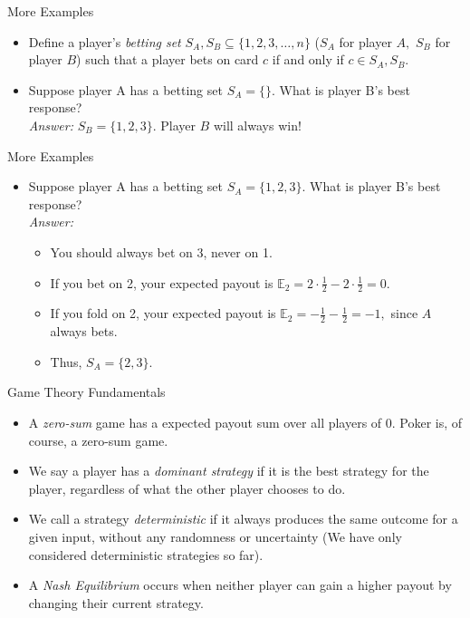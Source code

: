 \documentclass[aspectratio=169]{beamer}
\begin{document}
\begin{frame}{More Examples}
\begin{itemize}
 \item Define a player's \textit{betting set} $S_A, S_B \subseteq \{1,2,3,\ldots,n\}$ ($S_A$ for player $A,$ $S_B$ for player $B$)  such that a player bets on card $c$ if and only if $c \in S_A, S_B.$ \pause
    \item Suppose player A has a betting set $S_A = \{\}.$  What is player B's best response? \pause
     \\ \textit{Answer:} $S_B = \{1,2,3\}.$ Player $B$ will always win!
    \end{itemize}
    \end{frame}
\begin{frame}{More Examples}
\begin{itemize}
 \item Suppose player A has a betting set $S_A = \{1,2,3\}.$ What is player B's best response? \pause
    \\ \textit{Answer:}
    \begin{itemize}
    \item You should always bet on 3, never on 1. \pause
    \item If you bet on 2, your expected payout is $\mathbb{E}_2 = 2\cdot \frac{1}{2}-2\cdot\frac{1}{2} = 0.$\pause
    \item If you fold on 2, your expected payout is $\mathbb{E}_2 =-\frac{1}{2}-\frac{1}{2} = -1,$ since $A$ always bets. \pause
    \item Thus, $S_A = \{2,3\}.$
\end{itemize}
\end{itemize}
\end{frame}
\begin{frame}{Game Theory Fundamentals}
\begin{itemize}
   \item A \textit{zero-sum} game has a expected payout sum over all players of 0. Poker is, of course, a zero-sum game. \pause
   \item We say a player has a \textit{dominant strategy} if it is the best strategy for the player, regardless of what the other player chooses to do.\pause
    \item We call a strategy  \textit{deterministic} if it always produces the same outcome for a given input, without any randomness or uncertainty (We have only considered deterministic strategies so far).
    \pause
    \item A \textit{Nash Equilibrium} occurs when neither player can gain a higher payout by changing their current strategy.
\end{itemize}
\end{frame}
\end{document}
